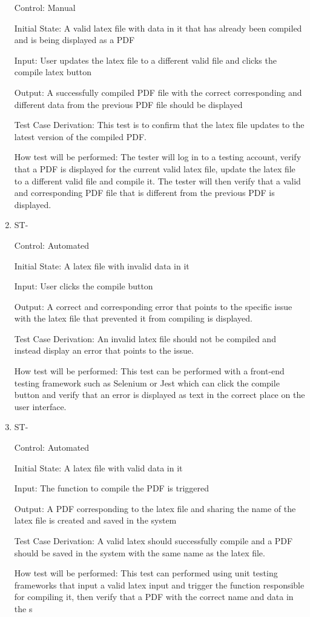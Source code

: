 \documentclass[12pt, titlepage]{article}
\newcounter{TESTID}
\newcommand\TESTNUM{\stepcounter{TESTID}\theTESTID}
\begin{document}
\begin{enumerate}
		Control: Manual
		
		Initial State: A valid latex file with data in it that has already been compiled and is being displayed as a PDF
		
		Input: User updates the latex file to a different valid file and clicks the compile latex button
		
		Output: A successfully compiled PDF file with the correct corresponding and different data from the previous PDF file should be displayed
		
		Test Case Derivation: This test is to confirm that the latex file updates to the latest version of the compiled PDF.
		
		How test will be performed: The tester will log in to a testing account, verify that a PDF is displayed for the current valid latex file, update the latex file to a different valid file and compile it. The tester will then verify that a valid and corresponding PDF file that is different from the previous PDF is displayed.
		
		\item{ST-\TESTNUM\\}
		
		Control: Automated
		
		Initial State: A latex file with invalid data in it
		
		Input: User clicks the compile button
		
		Output: A correct and corresponding error that points to the specific issue with the latex file that prevented it from compiling is displayed.
		
		Test Case Derivation: An invalid latex file should not be compiled and instead display an error that points to the issue.
		
		How test will be performed: This test can be performed with a front-end testing framework such as Selenium or Jest which can click the compile button and verify that an error is displayed as text in the correct place on the user interface.
		
		\item{ST-\TESTNUM\\}
		
		Control: Automated
		
		Initial State: A latex file with valid data in it
		
		Input: The function to compile the PDF is triggered
		
		Output: A PDF corresponding to the latex file and sharing the name of the latex file is created and saved in the system
		
		Test Case Derivation: A valid latex should successfully compile and a PDF should be saved in the system with the same name as the latex file.
		
		How test will be performed: This test can performed using unit testing frameworks that input a valid latex input and trigger the function responsible for compiling it, then verify that a PDF with the correct name and data in the s 
		
	\end{enumerate}
	
\end{document}
